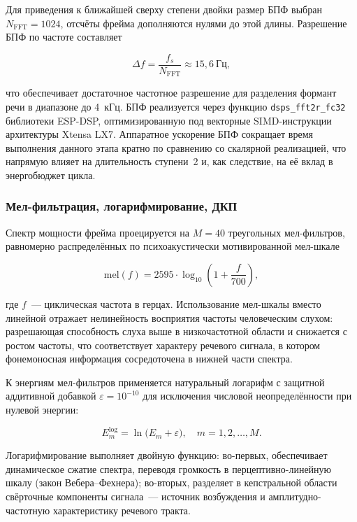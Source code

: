 Для приведения к ближайшей сверху степени двойки размер БПФ
выбран $N_{\mathrm{FFT}} = 1024$, отсчёты фрейма дополняются
нулями до этой длины. Разрешение БПФ по частоте составляет

\begin{equation}
	\Delta f = \frac{f_s}{N_{\mathrm{FFT}}} \approx 15{,}6~\text{Гц},
	\label{eq:fft_resolution}
\end{equation}

что обеспечивает достаточное частотное разрешение для разделения
формант речи в диапазоне до 4~кГц. БПФ реализуется через функцию
\texttt{dsps\_fft2r\_fc32} библиотеки ESP-DSP, оптимизированную
под векторные SIMD-инструкции архитектуры Xtensa LX7. Аппаратное
ускорение БПФ сокращает время выполнения данного этапа кратно по
сравнению со скалярной реализацией, что напрямую влияет на
длительность ступени~2 и, как следствие, на её вклад в
энергобюджет цикла.

\subsubsection{Мел-фильтрация, логарифмирование, ДКП}

Спектр мощности фрейма проецируется на $M = 40$ треугольных
мел-фильтров, равномерно распределённых по психоакустически
мотивированной мел-шкале

\begin{equation}
	\mathrm{mel}(f) = 2595 \cdot \log_{10}\!\left(1 + \frac{f}{700}\right),
	\label{eq:mel_scale}
\end{equation}

где $f$~--- циклическая частота в герцах. Использование
мел-шкалы вместо линейной отражает нелинейность восприятия
частоты человеческим слухом: разрешающая способность слуха выше
в низкочастотной области и снижается с ростом частоты, что
соответствует характеру речевого сигнала, в котором фонемоносная
информация сосредоточена в нижней части спектра.

К энергиям мел-фильтров применяется натуральный логарифм с
защитной аддитивной добавкой $\varepsilon = 10^{-10}$ для
исключения числовой неопределённости при нулевой энергии:

\begin{equation}
	E_m^{\log} = \ln\!\bigl(E_m + \varepsilon\bigr),
	\quad m = 1, 2, \ldots, M.
	\label{eq:log_mel}
\end{equation}

Логарифмирование выполняет двойную функцию: во-первых,
обеспечивает динамическое сжатие спектра, переводя громкость в
перцептивно-линейную шкалу (закон Вебера--Фехнера); во-вторых,
разделяет в кепстральной области свёрточные компоненты
сигнала~--- источник возбуждения и амплитудно-частотную
характеристику речевого тракта.

